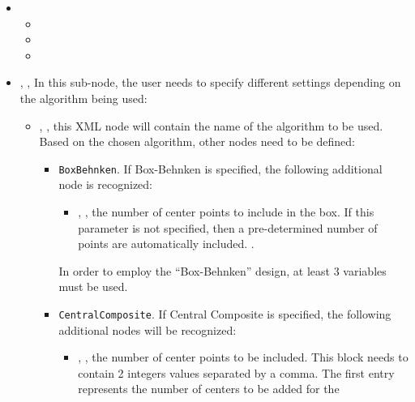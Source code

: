 \begin{itemize}
\item \variableDescription
 \variableChildrenIntro
 \begin{itemize}
    \item \distributionDescription
    \item \functionDescription
     \item \gridDescriptionOnlyCustom
 \end{itemize}
\item {}, ,
In this sub-node, the user needs to specify different settings depending on the
algorithm being used:
 \begin{itemize}
  \item {}, , this XML node
    will contain the name of the algorithm to be used.
    Based on the chosen algorithm, other nodes need to be defined:
    \begin{itemize}
      \item {}\texttt{BoxBehnken}. If Box-Behnken
        is specified, the following additional node is recognized:
     \begin{itemize}
      \item {}, , the
        number of center points to include in the box.
        If this parameter is not specified, then a pre-determined number of
        points are automatically included.
        .
     \end{itemize}
     \nb In order to employ the ``Box-Behnken'' design, at least 3 variables
     must be used.
     \item {}\texttt{CentralComposite}. If
       Central Composite is specified, the following additional nodes will
       be recognized:
     \begin{itemize}
      \item {}, , the number of center points to be included.
        This block needs to contain 2 integers values separated by a comma.
        The first entry represents the number of centers to be added for the

\end{itemize}
\end{itemize}
\end{itemize}
\end{itemize}
